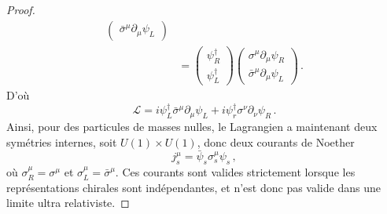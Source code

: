 \documentclass{article}
\numberwithin{equation}{section}
\theoremstyle{solution}
\begin{document}
\begin{proof}
\begin{align*}
\begin{pmatrix}
                 \bar{\sigma}^{\mu}\partial_\mu \psi_L 
         \end{pmatrix} \\
         &= 
        \begin{pmatrix}
                \psi_R^{\dagger} \\
                \psi_L^{\dagger}
        \end{pmatrix}
         \begin{pmatrix}
                 \sigma^{\mu} \partial_\mu \psi_R \\[1ex]
                 \bar{\sigma}^{\mu}\partial_\mu \psi_L 
         \end{pmatrix} \, .
\end{align*}
D'où
\begin{equation}
        \mathcal{L} = i \psi_L^{\dagger} \bar{\sigma}^{\mu} \partial_\mu \psi_L + i \psi_r^{\dagger} \sigma^{\nu}\partial_\nu \psi_R \, .
\end{equation}
Ainsi, pour des particules de masses nulles, le Lagrangien a maintenant deux symétries internes, soit $U(1)\times U(1)$, donc deux 
courants de Noether
\begin{equation}
        j^{\mu}_s = \bar{\psi}_s \sigma^{\mu}_s \psi_s\, ,
\end{equation} 
où $\sigma^{\mu}_R = \sigma^{\mu}$ et $\sigma^{\mu}_L = \bar{\sigma}^{\mu}$. Ces courants sont valides strictement lorsque les représentations chirales 
sont indépendantes, et n'est donc pas valide dans une limite ultra relativiste. 


\end{proof}
\end{document}
